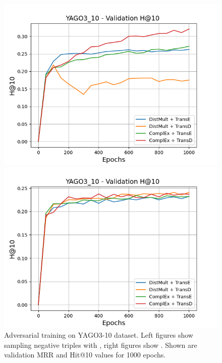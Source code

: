 \begin{figure}[H]
\begin{minipage}{.5\textwidth}
    \end{minipage}
    \begin{minipage}{.5\textwidth}
      \centering
      \includegraphics[width=0.9\linewidth]{figures/results/gan_train/not_pretrained/uncertainty/max/entropy/yago3_10/1k_epochs/uncertainty_yago3_10_hit10.png}
    \end{minipage}%
    \begin{minipage}{.5\textwidth}
      \centering
      \includegraphics[width=0.9\linewidth]{figures/results/gan_train/not_pretrained/uncertainty/max_distribution/entropy/yago3_10/1k_epochs/uncertainty_yago3_10_hit10.png}
    \end{minipage}%
    \caption{Adversarial training on \textsc{YAGO3-10} dataset. 
    Left figures show sampling negative triples with \usmax, right figures show \ussoftmax.
    Shown are validation MRR and Hit@10 values for 1000 epochs.}
    \label{fig:advtrain_yago3_10_usmax_ussoftmax}
\end{figure}

